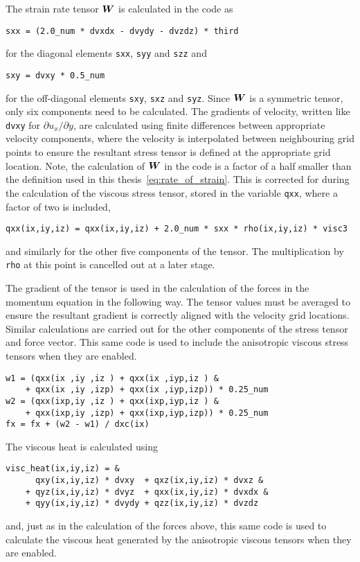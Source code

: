 The strain rate tensor ${\bm W}$ is calculated in the code as
\begin{lstlisting}
sxx = (2.0_num * dvxdx - dvydy - dvzdz) * third
\end{lstlisting}
for the diagonal elements \verb|sxx|, \verb|syy| and \verb|szz| and
\begin{lstlisting}
sxy = dvxy * 0.5_num
\end{lstlisting}
for the off-diagonal elements \verb|sxy|, \verb|sxz| and \verb|syz|. Since ${\bm W}$ is a symmetric tensor, only six components need to be calculated. The gradients of velocity, written like \verb|dvxy| for $\partial u_x / \partial y$, are calculated using finite differences between appropriate velocity components, where the velocity is interpolated between neighbouring grid points to ensure the resultant stress tensor is defined at the appropriate grid location. Note, the calculation of ${\bm W}$ in the code is a factor of a half smaller than the definition used in this thesis~\eqref{eq:rate_of_strain}. This is corrected for during the calculation of the viscous stress tensor, stored in the variable \verb|qxx|, where a factor of two is included,
\begin{lstlisting}
qxx(ix,iy,iz) = qxx(ix,iy,iz) + 2.0_num * sxx * rho(ix,iy,iz) * visc3
\end{lstlisting}
and similarly for the other five components of the tensor. The multiplication by \verb|rho| at this point is cancelled out at a later stage.

The gradient of the tensor is used in the calculation of the forces in the momentum equation in the following way. The tensor values must be averaged to ensure the resultant gradient is correctly aligned with the velocity grid locations. Similar calculations are carried out for the other components of the stress tensor and force vector. This same code is used to include the anisotropic viscous stress tensors when they are enabled.
\begin{lstlisting}
w1 = (qxx(ix ,iy ,iz ) + qxx(ix ,iyp,iz ) &
    + qxx(ix ,iy ,izp) + qxx(ix ,iyp,izp)) * 0.25_num
w2 = (qxx(ixp,iy ,iz ) + qxx(ixp,iyp,iz ) &
    + qxx(ixp,iy ,izp) + qxx(ixp,iyp,izp)) * 0.25_num
fx = fx + (w2 - w1) / dxc(ix)
\end{lstlisting}

The viscous heat is calculated using
\begin{lstlisting}
visc_heat(ix,iy,iz) = &
      qxy(ix,iy,iz) * dvxy  + qxz(ix,iy,iz) * dvxz &
    + qyz(ix,iy,iz) * dvyz  + qxx(ix,iy,iz) * dvxdx &
    + qyy(ix,iy,iz) * dvydy + qzz(ix,iy,iz) * dvzdz
\end{lstlisting}
and, just as in the calculation of the forces above, this same code is used to calculate the viscous heat generated by the anisotropic viscous tensors when they are enabled.


